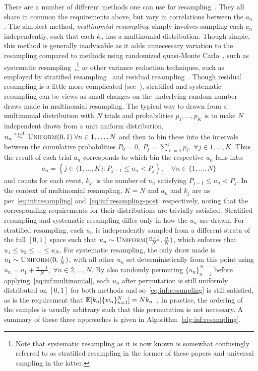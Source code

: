 There are a number of different methods one can use for resampling~\citep{douc2005comparison}.  They all share in 
common the requirements above, but vary in correlations between the $a_n$.  The simplest
method, \emph{multinomial resampling}, simply involves sampling each $a_n$ independently,
such that each $k_n$ has a multinomial distribution.  Though simple, this method is generally
inadvisable as it adds unnecessary variation to the resampling compared to methods using randomized
quasi-Monte Carlo~\citep{l2005recent}, such as systematic 
resampling~\cite{carpenter1999improved,whitley1994genetic},\footnote{Note that systematic resampling as it is now known is
	somewhat confusingly referred to as stratified resampling in the former of these papers and universal
	sampling in the latter.}
or other variance reduction techniques, such as employed by stratified 
resampling~\citep{kitagawa1996monte} and residual resampling~\citep{whitley1994genetic}.
Though residual resampling is a little more complicated (see~\cite{douc2005comparison}),
stratified and systematic resampling can be views as small changes on the underlying random
number draws made in multinomial resampling.  The typical way to drawn from a multinomial
distribution with $N$ trials and probabilities $p_1,\dots,p_K$ is to make $N$ independent
draws from a unit uniform distribution, $u_n \overset{i.i.d.}{\sim} \textsc{Uniform}(0,1) \; \forall n\in1,\dots,N$
and then to bin these into the intervals between the cumulative probabilities
$P_0 = 0, \; P_{j} = \sum_{\ell=1}^{j} p_{\ell}, \; \forall j\in1,\dots,K$.  Thus 
the result of each trial $a_n$ corresponds to which bin the respective $u_n$ falls into:
\begin{align}
\label{eq:inf:multinomial}
a_n = \left\{j \in \{1,\dots,K\} \colon P_{j-1} \le u_n < P_j\right\}, \quad \forall n \in \{1,\dots,N\}
\end{align}
and counts for each event, $k_j$, is the number of $u_n$ satisfying $P_{j-1} \le u_n < P_j$.
In the context of multinomial resampling, $K=N$ and $a_n$ and $k_j$ are as per~\eqref{eq:inf:resampling}
and~\eqref{eq:inf:resampling-post} respectively, noting that the corresponding requirements
for their distributions are trivially satisfied.
Stratified resampling and systematic resampling differ only in how the $u_n$ are drawn. 
For stratified resampling, each $u_n$ is independently sampled from a different strata of the full
$[0,1]$ space such that $u_n \sim \textsc{Uniform}(\frac{n-1}{N},\frac{n}{N})$, which enforces
that $u_1 \le u_2 \le \dots \le u_N$.  For systematic resampling, the only draw made is
$u_1 \sim \textsc{Uniform}(0,\frac{1}{N})$, with all other $u_n$ set deterministically from this
point using $u_n = u_1+\frac{n-1}{N}, \; \forall n\in2,\dots,N$.
By also randomly permuting $\{u_{n}\}_{n=1}^N$ before
applying~\eqref{eq:inf:multinomial}, each $u_n$ after permutation is still 
uniformly distributed on $[0,1]$ for both methods and so~\eqref{eq:inf:resampling} is still satisfied, 
as is the requirement that $\mathbb{E}[k_n | \{w_n\}_{n=1}^N] = Nk_n$~\citep{douc2005comparison}.
In practice, the ordering of the samples is usually arbitrary such that this permutation is not necessary.
A summary of these three approaches is given in Algorithm~\ref{alg:inf:resampling}.

